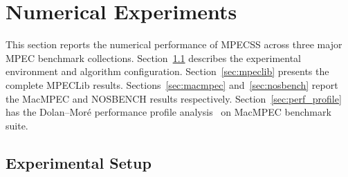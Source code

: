 %

\section{Numerical Experiments}
\label{sec:numerical}

This section reports the numerical performance of MPECSS across three
major MPEC benchmark collections. Section~\ref{sec:exp_setup} describes the experimental
environment and algorithm configuration.  Section~\ref{sec:mpeclib}
presents the complete MPECLib results.  Sections~\ref{sec:macmpec}
and~\ref{sec:nosbench} report the MacMPEC and NOSBENCH results
respectively.
Section~\ref{sec:perf_profile} has the Dolan--Mor\'{e}
performance profile analysis~\cite{DolanMore2002} on
MacMPEC benchmark suite.


\subsection{Experimental Setup}
\label{sec:exp_setup}

